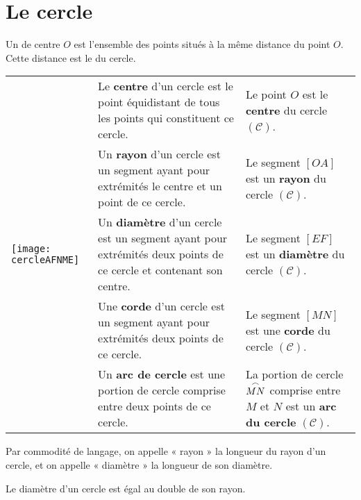 
\newpage



\section{Le cercle}

\begin{definition}
Un \textbf{} de centre $O$ est l'ensemble des points situés à la même distance du point $O$. 
Cette distance est le \textbf{} du cercle.
\end{definition}

\begin{aconnaitre}
\begin{tabularx}{.95\linewidth}{|X|p{5cm}|p{3cm}|}
\hline
\multirow{5}{*}{\texttt{[image: cercleAFNME]}}  & Le \textcolor{C2}{\textbf{centre}} d'un cercle est le point équidistant de tous les points qui constituent ce cercle. & Le point $O$ est le \textcolor{C2}{\textbf{centre}} du cercle $(\mathcal{C})$.\\ \cline{2-3}
 & Un \textcolor{J1}{\textbf{rayon}} d'un cercle est un segment ayant pour extrémités le centre et un point de ce cercle. & Le segment $[OA]$ est un  \textcolor{J1}{\textbf{rayon}} du cercle $(\mathcal{C})$.\\ \cline{2-3}
  & Un  \textcolor{H1}{\textbf{diamètre}} d'un cercle est un segment ayant pour extrémités deux points de ce cercle et contenant son centre. & Le segment $[EF]$ est un  \textcolor{H1}{\textbf{diamètre}} du cercle $(\mathcal{C})$.\\ \cline{2-3}
 & Une  \textcolor{PartieFonction}{\textbf{corde}} d'un cercle est un segment ayant pour extrémités deux points de ce cercle. & Le segment $[MN]$ est une  \textcolor{PartieFonction}{\textbf{corde}} du cercle $(\mathcal{C})$.\\ \cline{2-3}
 & Un  \textcolor{B2}{\textbf{arc de cercle}} est une portion de cercle comprise entre deux points de ce cercle. & La portion de cercle $\overset{\huge{\frown}}{MN}$ comprise entre $M$ et $N$ est un  \textcolor{B2}{\textbf{arc du cercle}} $(\mathcal{C})$.\\ \hline
  \end{tabularx}
 \end{aconnaitre}
  
  
 \begin{remarque}
 Par commodité de langage, on appelle « rayon » la longueur du rayon d'un cercle, et  on appelle « diamètre » la longueur de son diamètre.
  \end{remarque}
  
 \begin{remarque}
 Le diamètre d'un cercle est égal au double de son rayon.
  \end{remarque}